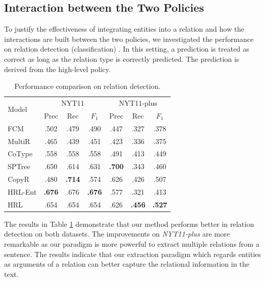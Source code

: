 \documentclass[letterpaper]{article} %
\theoremstyle{definition}
\begin{document}
\subsection{Interaction between the Two Policies}

To justify the effectiveness of integrating entities into a relation and how the interactions are built between the two policies, we investigated the performance on relation detection (classification)%
. In this setting, a prediction is treated as correct as long as the relation type is correctly predicted. The prediction is derived from the high-level policy.

\begin{table}[!htb]
    \centering
    \begin{tabular}{lcccccc}
    \toprule
        \multirow{2}{*}{Model} & \multicolumn{3}{c}{NYT11} & \multicolumn{3}{c}{NYT11-plus}\\
         & Prec & Rec & $F_1$ & Prec & Rec & $F_1$ \\
    \midrule
        FCM    & .502 & .479 & .490 & .447 & .327 & .378 \\
        MultiR & .465 & .439 & .451 & .423 & .336 & .375 \\
        CoType & .558 & .558 & .558 & .491 & .413 & .449 \\
        SPTree & .650 & .614 & .631 & \textbf{.700} & .343 & .460 \\
        CopyR & .480 & \textbf{.714} & .574 & .626 & .426 & .507\\
    \midrule
        HRL-Ent  & \textbf{.676} & .676 & \textbf{.676} & .577 & .321 & .413 \\
        HRL    & .654 & .654 & .654 & .626 & \textbf{.456} & \textbf{.527} \\
    \bottomrule
    \end{tabular}
    \caption{Performance comparison on relation detection.} %
    \label{relation}
\end{table}

The results in Table \ref{relation} demonstrate that our method performs better in relation detection on both datasets. The improvements on {\it NYT11-plus} are more remarkable as our paradigm is more powerful to extract multiple relations from a sentence.
The results indicate that our extraction paradigm which regards entities as arguments of a relation can better capture the relational information in the text.
\end{document}
